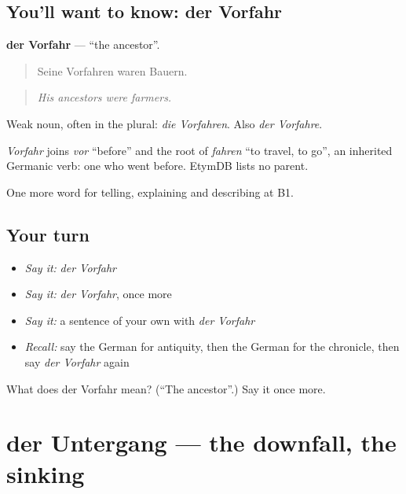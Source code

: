\subsection*{You'll want to know: der Vorfahr}
\textbf{der Vorfahr} — \textquotedblleft{}the ancestor\textquotedblright{}.

\begin{quote}
Seine Vorfahren waren Bauern.
\end{quote}

\begin{quote}
\emph{His ancestors were farmers.}
\end{quote}

Weak noun, often in the plural: \emph{die Vorfahren}. Also \emph{der Vorfahre}.

\begin{cousinweb}
\emph{Vorfahr} joins \emph{vor} \textquotedblleft{}before\textquotedblright{} and the root of \emph{fahren} \textquotedblleft{}to travel, to go\textquotedblright{}, an inherited Germanic verb: one who went before. EtymDB lists no parent.
\end{cousinweb}

\begin{grammarlens}[title={What you've built}]
One more word for telling, explaining and describing at B1.
\end{grammarlens}

\subsection*{Your turn}
\begin{itemize}
\raggedright
  \item \emph{Say it:} \emph{der Vorfahr}
  \item \emph{Say it:} \emph{der Vorfahr}, once more
  \item \emph{Say it:} a sentence of your own with \emph{der Vorfahr}
  \item \emph{Recall:} say the German for antiquity, then the German for the chronicle, then say \emph{der Vorfahr} again
\end{itemize}

\begin{tcolorbox}[breakable,colback=teal!4,colframe=teal!35!black,title={Before you move on}]
What does der Vorfahr mean? (\textquotedblleft{}The ancestor\textquotedblright{}.) Say it once more.
\end{tcolorbox}
\section[der Untergang]{der Untergang — the downfall, the sinking}

